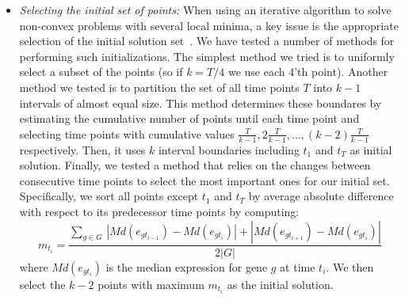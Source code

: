 \documentclass[10pt]{article}
\begin{document}
\begin{itemize}
\item {\em Selecting the initial set of points:} When using an iterative algorithm to solve non-convex problems with several local minima,
a key issue is the appropriate selection of the initial solution set~\cite{kmeans, mixture}. We have tested a number
of methods for performing such initializations. The simplest method
we tried is to uniformly select a subset of the points (so if
$k=T/4$ we use each 4'th point). Another method we tested is to partition the set
of all time points $T$ into $k-1$ intervals of almost equal size. This
method determines these boundares by estimating the cumulative number of points until each time point and
selecting time points with cumulative values $\frac{T}{k-1}, 2\frac{T}{k-1},
\ldots, (k-2)\frac{T}{k-1}$ respectively. Then, it uses $k$ interval
boundaries including $t_{1}$ and $t_{T}$ as initial solution. Finally, we tested a
method that relies on the changes between consecutive time points to
select the most important ones for our initial set. Specifically, we sort all points except $t_{1}$ and $t_{T}$ by average
absolute difference with respect to its predecessor time points by
computing:
%
\begin{equation}
m_{t_{i}} = \frac{\sum_{g \in G}\,|Md(e_{g t_{i-1}}) - Md(e_{g t_{i}})| + |Md(e_{g t_{i+1}}) - Md(e_{g t_{i}})|}{2|G|}
\end{equation}
%
where $Md(e_{g t_{i}})$ is the median expression for gene $g$ at
time $t_{i}$. We then select the $k-2$ points with maximum $m_{t_{i}}$
as the initial solution.


\end{itemize}
\end{document}
